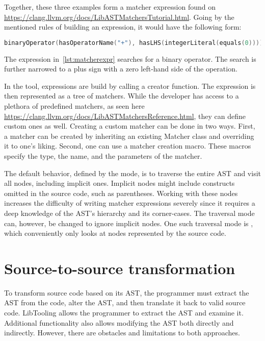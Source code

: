 Together, these three examples form a matcher expression found on 
\url{https://clang.llvm.org/docs/LibASTMatchersTutorial.html}. 
Going by the mentioned rules of building an expression, it would have 
the following form: 

\begin{lstlisting}[caption=Matcher expression., language=C++, 
label={lst:matcherexpr}, numbers=none]
binaryOperator(hasOperatorName("+"), hasLHS(integerLiteral(equals(0)))).
\end{lstlisting}

The expression in~\ref{lst:matcherexpr} searches for a binary operator. 
The search is further narrowed to a plus sign with a zero left-hand 
side of the operation.

In the tool, expressions are build by calling a creator function. 
The expression is then represented as a tree of matchers. 
While the developer has access to a plethora of predefined matchers, 
as seen here \url{https://clang.llvm.org/docs/LibASTMatchersReference.html}, 
they can define custom ones as well. 
Creating a custom matcher can be done in two ways. 
First, a matcher can be created by inheriting an existing Matcher class 
and overriding it to one's liking. 
Second, one can use a matcher creation macro. 
These macros specify the type, the name, and the parameters of the matcher.

The default behavior, defined by the  mode, is to traverse 
the entire AST and visit all nodes, including implicit ones. 
Implicit nodes might include constructs omitted in the source code, 
such as parentheses. 
Working with these nodes increases the difficulty of writing matcher 
expressions severely since it requires a deep knowledge of the AST's 
hierarchy and its corner-cases. 
The traversal mode can, however, be changed to ignore implicit nodes. 
One such traversal mode is , 
which conveniently only looks at nodes represented by the source code. 

\section{Source-to-source transformation}

To transform source code based on its AST, the programmer must extract 
the AST from the code, alter the AST, and then translate it back to valid 
source code. 
LibTooling allows the programmer to extract the AST and examine it. 
Additional functionality also allows modifying the AST both directly 
and indirectly. 
However, there are obstacles and limitations to both approaches. 

